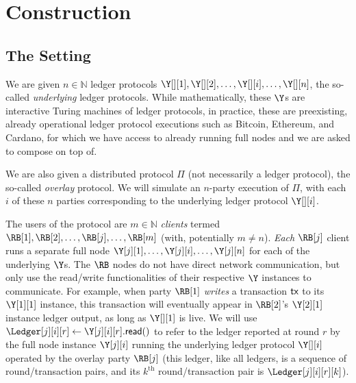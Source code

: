\section{Construction}\label{sec:construction}

\subsection{The Setting}

We are given $n \in \mathbb{N}$ ledger protocols
$\Y[][1], \Y[][2], \ldots, \Y[][i], \ldots, \Y[][n]$,
the so-called \emph{underlying} ledger protocols.
While mathematically, these $\Y$s are interactive Turing machines of ledger protocols,
in practice, these are preexisting, already operational ledger protocol executions
such as Bitcoin, Ethereum, and Cardano, for which we have access to already running full nodes
and we are asked to compose on top of.

We are also given a distributed protocol $\Pi$ (not necessarily a ledger protocol),
the so-called \emph{overlay} protocol. We will simulate an $n$-party execution of $\Pi$,
with each $i$ of these $n$ parties corresponding to the underlying ledger protocol $\Y[][i]$.

The users of the protocol are $m \in \mathbb{N}$ \rollerblade \emph{clients} termed
$\RB[1], \RB[2], \ldots, \RB[j], \ldots, \RB[m]$ (with, potentially $m \neq n$).
\emph{Each} $\RB[j]$ client runs a separate full node $\Y[j][1], \ldots, \Y[j][i], \ldots, \Y[j][n]$
for each of the underlying $\Y$s. The $\RB$ nodes do not have direct network communication, but only
use the read/write functionalities of their respective $\Y$ instances to communicate.
For example, when party $\RB[1]$ \emph{writes} a transaction $\textsf{tx}$ to its $\Y[1][1]$ instance,
this transaction will eventually appear in $\RB[2]$'s $\Y[2][1]$ instance ledger output,
as long as $\Y[][1]$ is live.
We will use $\Ledger[j][i][r] \gets \Y[j][i][r].\lread()$ to refer to the ledger reported at
round $r$ by the full node instance $\Y[j][i]$ running the underlying ledger protocol $\Y[][i]$
operated by the overlay party $\RB[j]$
(this ledger, like all ledgers, is a sequence of round/transaction pairs, and its
$k^\text{th}$ round/transaction pair is $\Ledger[j][i][r][k]$).
%

